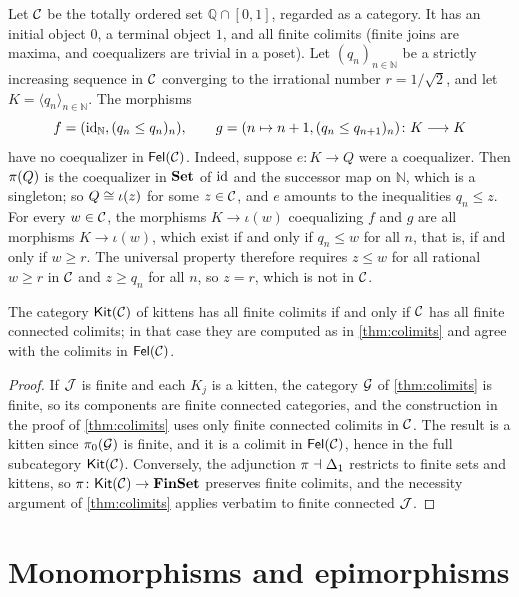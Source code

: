 \begin{counterexample}\label{cex:coequalizer-rationals}
Let $\mathcal{C}$ be the totally ordered set $\mathbb Q\cap[0,1]$, regarded as a
category. It has an initial object $0$, a terminal object $1$, and all finite
colimits (finite joins are maxima, and coequalizers are trivial in a poset).
Let $(q_n)_{n\in\mathbb N}$ be a strictly increasing sequence in $\mathcal{C}$
converging to the irrational number $r=1/\sqrt2$, and let
$K=\langle q_n\rangle_{n\in\mathbb N}$. The morphisms
\[
f=(\mathrm{id}_{\mathbb N},(q_n\le q_n)_n),\qquad g=(n\mapsto n+1,(q_n\le q_{n+1})_n)\colon K\longrightarrow K
\]
have no coequalizer in $\mathsf{Fel}(\mathcal{C})$. Indeed, suppose $e\colon K\to Q$ were a
coequalizer. Then $\pi(Q)$ is the coequalizer in $\mathbf{Set}$ of $\mathrm{id}$ and the
successor map on $\mathbb N$, which is a singleton; so $Q\cong\iota(z)$ for some
$z\in\mathcal{C}$, and $e$ amounts to the inequalities $q_n\le z$. For every
$w\in\mathcal{C}$, the morphisms $K\to\iota(w)$ coequalizing $f$ and $g$ are all
morphisms $K\to\iota(w)$, which exist if and only if $q_n\le w$ for all $n$,
that is, if and only if $w\geq r$. The universal property therefore requires
$z\le w$ for all rational $w\ge r$ in $\mathcal{C}$ and $z\ge q_n$ for all $n$, so
$z=r$, which is not in $\mathcal{C}$.
\end{counterexample}

\begin{proposition}\label{prop:kit-colimits}
The category $\mathsf{Kit}(\mathcal{C})$ of kittens has all finite colimits if and only if
$\mathcal{C}$ has all finite connected colimits; in that case they are computed as in
\cref{thm:colimits} and agree with the colimits in $\mathsf{Fel}(\mathcal{C})$.
\end{proposition}

\begin{proof}
If $\mathcal{J}$ is finite and each $K_j$ is a kitten, the category $\mathcal{G}$ of
\cref{thm:colimits} is finite, so its components are finite connected
categories, and the construction in the proof of \cref{thm:colimits} uses
only finite connected colimits in $\mathcal{C}$. The result is a kitten since
$\pi_0(\mathcal{G})$ is finite, and it is a colimit in $\mathsf{Fel}(\mathcal{C})$, hence in the full
subcategory $\mathsf{Kit}(\mathcal{C})$. Conversely, the adjunction $\pi\dashv\Delta_1$
restricts to finite sets and kittens, so $\pi\colon\mathsf{Kit}(\mathcal{C})\to\mathbf{FinSet}$
preserves finite colimits, and the necessity argument of \cref{thm:colimits}
applies verbatim to finite connected $\mathcal{J}$.
\end{proof}

\section{Monomorphisms and epimorphisms}\label{sec:mono-epi}

